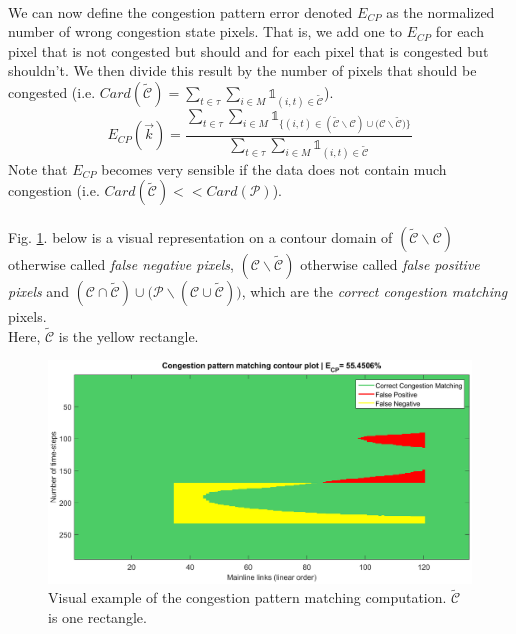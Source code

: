 \\
We can now define the congestion pattern error denoted $E_{CP}$ as the normalized number of wrong congestion state pixels. That is, we add one to $E_{CP}$ for each pixel that is not congested but should and for each pixel that is congested but shouldn't. We then divide this result by the number of pixels that should be congested (i.e. $Card(\widetilde{\mathscr{C}})=\sum_{t\in{\tau}}\sum_{i\in{M}}\mathds{1}_{(i,t)\in{\widetilde{\mathscr{C}}}}$).
\begin{equation*}
	E_{CP}(\vec{k})=\frac{\sum_{t\in{\tau}}\sum_{i\in{M}}\mathds{1}_{\{(i,t)\in{(\widetilde{\mathscr{C}}\backslash \mathscr{C})\cup(\mathscr{C}\backslash \widetilde{\mathscr{C}} })\}}}{\sum_{t\in{\tau}}\sum_{i\in{M}}\mathds{1}_{(i,t)\in{\widetilde{\mathscr{C}}}}}
\end{equation*}
Note that $E_{CP}$ becomes very sensible if the data does not contain much congestion (i.e. $Card(\widetilde{\mathscr{C}})<<Card(\mathscr{P})$).\\
\\
Fig. \ref{fig:cp_example}. below is a visual representation on a contour domain of $(\widetilde{\mathscr{C}}\backslash \mathscr{C})$ otherwise called \emph{false negative pixels}, $(\mathscr{C}\backslash\widetilde{\mathscr{C}})$ otherwise called \emph{false positive pixels} and $(\mathscr{C}\cap\widetilde{\mathscr{C}})\cup \big(\mathscr{P}\backslash(\mathscr{C}\cup \widetilde{\mathscr{C}})\big)$, which are the \emph{correct congestion matching} pixels. 
\\Here, $\widetilde{\mathscr{C}}$ is the yellow rectangle.
\begin{figure}[h]
	\caption{Visual example of the congestion pattern matching computation. $\widetilde{\mathscr{C}}$ is one rectangle.}
	\label{fig:cp_example}
	\includegraphics[width=7in]{figures/cp_example.png}
\end{figure}
